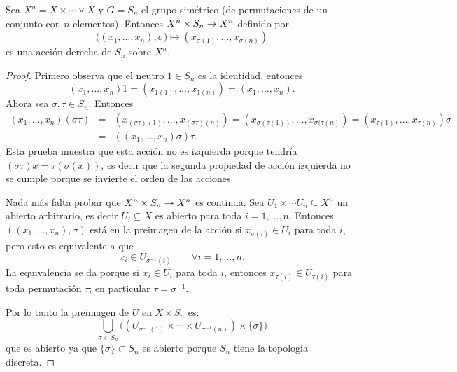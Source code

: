 \begin{ejercicio}\label{ej:28}
  Sea $X^n=X\times\cdots\times X$ y $G=S_n$ el grupo sim\'etrico (de permutaciones de un conjunto con
  $n$ elementos). Entonces $X^n\times S_n \rightarrow X^n$ definido por
  \[
    \big( (x_1,\ldots,x_n),\sigma \big)\mapsto(x_{\sigma(1)},\ldots,x_{\sigma(n)})
  \]
  es una acci\'on derecha de $S_n$ sobre $X^n$.
\end{ejercicio}
\begin{proof}%
  Primero observa que el neutro $1\in S_n$ es la identidad, entonces
  \[
    (x_1,\ldots,x_n)1=(x_{1(1)},\ldots,x_{1(n)})=(x_1,\ldots,x_n).
  \]
  Ahora sea $\sigma,\tau\in S_n$. Entonces
  \begin{eqnarray*}
    (x_{1},\ldots,x_{n})(\sigma\tau) &=&
    (x_{(\sigma\tau)(1)},\ldots,x_{(\sigma\tau)(n)})=
    (x_{\sigma(\tau(1))},\ldots,x_{\sigma(\tau(n)})=
    (x_{\tau(1)},\ldots,x_{\tau(n)})\sigma \\ &=&
    ((x_{1},\ldots,x_{n})\sigma)\tau.
  \end{eqnarray*}
  Esta prueba muestra que esta acci\'on no es izquierda porque tendr\'ia
  $(\sigma\tau)x=\tau(\sigma(x))$, es decir que la segunda propiedad de acci\'on izquierda no se
  cumple porque se invierte el orden de las acciones.

  Nada m\'as falta probar que $X^n\times S_n\rightarrow X^n$ es continua. Sea
  $U_1\times\cdots U_n\subseteq X^n$ un abierto arbitrario, es decir $U_i\subseteq X$ es abierto
  para toda $i=1,\ldots,n$. Entonces $((x_1,\ldots,x_n),\sigma)$ est\'a en la preimagen de la
  acci\'on si $x_{\sigma(i)}\in U_i$ para toda $i$, pero esto es equivalente a que
  \[
    x_i\in U_{\sigma^{-1}(i)} \qquad \forall i=1,\ldots,n.
  \]
  La equivalencia se da porque si $x_i\in U_i$ para toda $i$, entonces $x_{\tau(i)}\in U_{\tau(i)}$
  para toda permutaci\'on $\tau$; en particular $\tau=\sigma^{-1}$.
  
  Por lo tanto la preimagen de $U$ en $X\times S_n$ es:
  \[
    \bigcup_{\sigma\in S_n}
    \big((U_{\sigma^{-1}(1)}\times \cdots\times U_{\sigma^{-1}(n)})\times\{\sigma\}\big)
  \]
  que es abierto ya que $\{\sigma\}\subset S_n$ es abierto porque $S_n$ tiene la topolog\'ia
  discreta.
\end{proof}%

